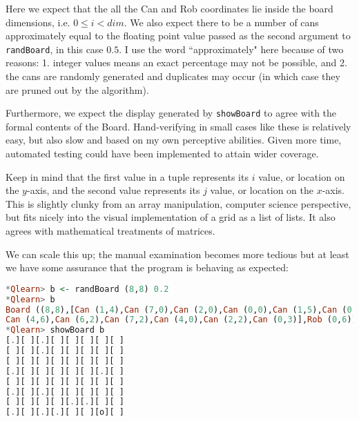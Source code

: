 \documentclass[12pt,a4paper]{article}
\begin{document}
			\par Here we expect that the all the Can and Rob coordinates lie inside the board dimensions, i.e. $0 \leq i < dim$. We also expect there to be a number of cans approximately equal to the floating point value passed as the second argument to \texttt{randBoard}, in this case $0.5$. I use the word ``approximately" here because of two reasons: 1. integer values means an exact percentage may not be possible, and 2. the cans are randomly generated and duplicates may occur (in which case they are pruned out by the algorithm).
			\par Furthermore, we expect the display generated by \texttt{showBoard} to agree with the formal contents of the Board. Hand-verifying in small cases like these is relatively easy, but also slow and based on my own perceptive abilities. Given more time, automated testing could have been implemented to attain wider coverage.
			\par Keep in mind that the first value in a tuple represents its $i$ value, or location on the $y$-axis, and the second value represents its $j$ value, or location on the $x$-axis. This is slightly clunky from an array manipulation, computer science perspective, but fits nicely into the visual implementation of a grid as a list of lists. It also agrees with mathematical treatments of matrices.
			\par We can scale this up; the manual examination becomes more tedious but at least we have some assurance that the program is behaving as expected:\\
			
			\begin{lstlisting}[language=Haskell,numbers=none]
*Qlearn> b <- randBoard (8,8) 0.2
*Qlearn> b
Board ((8,8),[Can (1,4),Can (7,0),Can (2,0),Can (0,0),Can (1,5),Can (0,2),
Can (4,6),Can (6,2),Can (7,2),Can (4,0),Can (2,2),Can (0,3)],Rob (0,6))
*Qlearn> showBoard b
[.][ ][.][ ][ ][ ][ ][ ]
[ ][ ][.][ ][ ][ ][ ][ ]
[ ][ ][ ][ ][ ][ ][ ][ ]
[.][ ][ ][ ][ ][ ][.][ ]
[ ][ ][ ][ ][ ][ ][ ][ ]
[.][ ][.][ ][ ][ ][ ][ ]
[ ][ ][ ][ ][.][.][ ][ ]
[.][ ][.][.][ ][ ][o][ ]
			\end{lstlisting}\ \\
			
\end{document}
